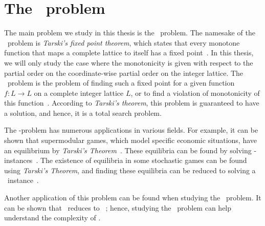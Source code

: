 \section{The \Tarski\ problem}\label{sec:intro_tarski_problem}

The main problem we study in this thesis is the \Tarski\ problem. The namesake of the \Tarski\ problem is \textit{Tarski's fixed point theorem}, which states that every monotone function that maps a complete lattice to itself has a fixed point~. In this thesis, we will only study the case where the monotonicity is given with respect to the partial order on the coordinate-wise partial order on the integer lattice. The \Tarski\ problem is the problem of finding such a fixed point for a given function $f : L \rightarrow L$ on a complete integer lattice $L$, or to find a violation of monotonicity of this function~. According to \textit{Tarski's theorem}, this problem is guaranteed to have a solution, and hence, it is a total search problem.

The \Tarski-problem has numerous applications in various fields. For example, it can be shown that supermodular games, which model specific economic situations, have an equilibrium by \textit{Tarski's Theorem}~. These equilibria can be found by solving \Tarski-instances~\cite{etessami_tarskis_2020}. The existence of equilibria in some stochastic games can be found using \textit{Tarski's Theorem}, and finding these equilibria can be reduced to solving a \Tarski\ instance~.

Another application of this problem can be found when studying the \Arrival\ problem. It can be shown that \Arrival\ reduces to \Tarski~; hence, studying the \Tarski\ problem can help understand the complexity of \Arrival.

